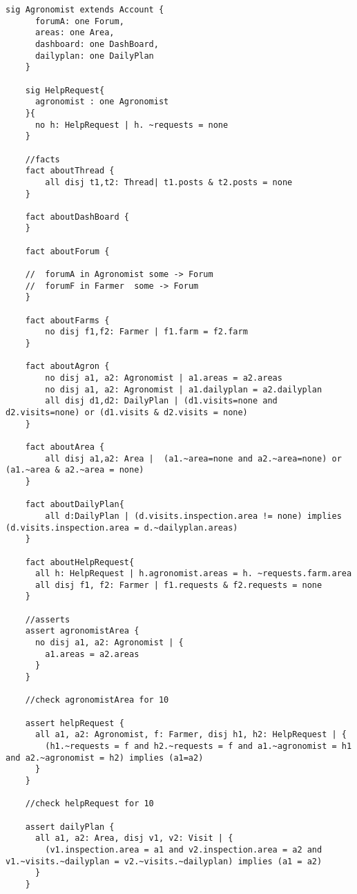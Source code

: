 \begin{lstlisting}[language=alloy]
    sig Agronomist extends Account {
      forumA: one Forum,
      areas: one Area,
      dashboard: one DashBoard,
      dailyplan: one DailyPlan
    }
    
    sig HelpRequest{
      agronomist : one Agronomist
    }{
      no h: HelpRequest | h. ~requests = none
    }
    
    //facts
    fact aboutThread {
        all disj t1,t2: Thread| t1.posts & t2.posts = none
    }
    
    fact aboutDashBoard {
    }
    
    fact aboutForum {
    
    //  forumA in Agronomist some -> Forum
    //  forumF in Farmer  some -> Forum
    }
    
    fact aboutFarms {
        no disj f1,f2: Farmer | f1.farm = f2.farm
    }
    
    fact aboutAgron {
        no disj a1, a2: Agronomist | a1.areas = a2.areas
        no disj a1, a2: Agronomist | a1.dailyplan = a2.dailyplan 
        all disj d1,d2: DailyPlan | (d1.visits=none and d2.visits=none) or (d1.visits & d2.visits = none) 
    }
    
    fact aboutArea {
        all disj a1,a2: Area |  (a1.~area=none and a2.~area=none) or (a1.~area & a2.~area = none) 
    }
    
    fact aboutDailyPlan{
        all d:DailyPlan | (d.visits.inspection.area != none) implies (d.visits.inspection.area = d.~dailyplan.areas) 
    }
    
    fact aboutHelpRequest{
      all h: HelpRequest | h.agronomist.areas = h. ~requests.farm.area
      all disj f1, f2: Farmer | f1.requests & f2.requests = none
    }
    
    //asserts
    assert agronomistArea {
      no disj a1, a2: Agronomist | {
        a1.areas = a2.areas
      }
    }
    
    //check agronomistArea for 10
    
    assert helpRequest {
      all a1, a2: Agronomist, f: Farmer, disj h1, h2: HelpRequest | {
        (h1.~requests = f and h2.~requests = f and a1.~agronomist = h1 and a2.~agronomist = h2) implies (a1=a2) 
      }
    }
    
    //check helpRequest for 10
    
    assert dailyPlan {
      all a1, a2: Area, disj v1, v2: Visit | {
        (v1.inspection.area = a1 and v2.inspection.area = a2 and v1.~visits.~dailyplan = v2.~visits.~dailyplan) implies (a1 = a2)
      }
    }
    

\end{lstlisting}
